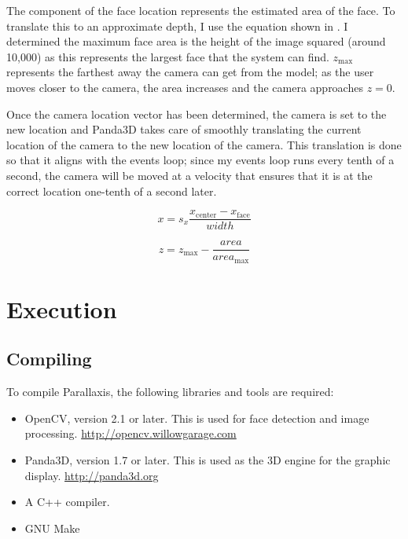 The  component of the face location represents the
estimated area of the face. To translate this to an approximate depth,
I use the equation shown in . I determined the maximum
face area is the height of the image squared (around 10,000) as this
represents the largest face that the system can
find. $z_{\mathrm{max}}$ represents the farthest away the camera can
get from the model; as the user moves closer to the camera, the area
increases and the camera approaches $z = 0$.

Once the camera location vector has been determined, the camera is set
to the new location and Panda3D takes care of smoothly translating the
current location of the camera to the new location of the camera. This
translation is done so that it aligns with the events loop; since my
events loop runs every tenth of a second, the camera will be moved at
a velocity that ensures that it is at the correct location one-tenth
of a second later.

\begin{equation}
  \label{eq:xdist}
  x = s_x \frac{x_{\mathrm{center}} - x_{\mathrm{face}}}{width}
\end{equation}

\begin{equation}
  \label{eq:zdist}
  z = z_{\mathrm{max}} - \frac{area}{area_{\mathrm{max}}}
\end{equation}


\section{Execution}

\subsection{Compiling}
To compile Parallaxis, the following libraries and tools are required:
\begin{itemize}
\item OpenCV, version 2.1 or later. This is used for face detection
  and image processing. \url{http://opencv.willowgarage.com}
\item Panda3D, version 1.7 or later. This is used as the 3D engine for
  the graphic display. \url{http://panda3d.org}
\item A C++ compiler.
\item GNU Make
\end{itemize}

